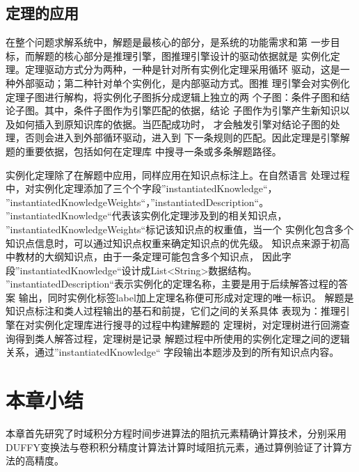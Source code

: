 \documentclass{standalone}
\begin{document}
\subsection{定理的应用}
在整个问题求解系统中，解题是最核心的部分，是系统的功能需求和第
一步目标，而解题的核心部分是推理引擎，图推理引擎设计的驱动依据就是
实例化定理。定理驱动方式分为两种，一种是针对所有实例化定理采用循环
驱动，这是一种外部驱动；第二种针对单个实例化，是内部驱动方式。图推
理引擎会对实例化定理子图进行解构，将实例化子图拆分成逻辑上独立的两
个子图：条件子图和结论子图。其中，条件子图作为引擎匹配的依据，结论
子图作为引擎产生新知识以及如何插入到原知识库的依据。当匹配成功时，
才会触发引擎对结论子图的处理，否则会进入到外部循环驱动，进入到
下一条规则的匹配。因此定理是引擎解题的重要依据，包括如何在定理库
中搜寻一条或多条解题路径。

实例化定理除了在解题中应用，同样应用在知识点标注上。在自然语言
处理过程中，对实例化定理添加了三个个字段”instantiatedKnowledge“，
”instantiatedKnowledgeWeights“，”instantiatedDescription“。
”instantiatedKnowledge“代表该实例化定理涉及到的相关知识点，
”instantiatedKnowledgeWeights“标记该知识点的权重值，当一个
实例化包含多个知识点信息时，可以通过知识点权重来确定知识点的优先级。
知识点来源于初高中教材的大纲知识点，由于一条定理可能包含多个知识点，
因此字段”instantiatedKnowledge“设计成List<String>数据结构。
”instantiatedDescription“表示实例化的定理名称，主要是用于后续解答过程的答案
输出，同时实例化标签label加上定理名称便可形成对定理的唯一标识。
解题是知识点标注和类人过程输出的基石和前提，它们之间的关系具体
表现为：推理引擎在对实例化定理库进行搜寻的过程中构建解题的
定理树，对定理树进行回溯查询得到类人解答过程，定理树是记录
解题过程中所使用的实例化定理之间的逻辑关系，通过”instantiatedKnowledge“
字段输出本题涉及到的所有知识点内容。


\section{本章小结}
本章首先研究了时域积分方程时间步进算法的阻抗元素精确计算技术，分别采用DUFFY变换法与卷积积分精度计算法计算时域阻抗元素，通过算例验证了计算方法的高精度。
\end{document}
